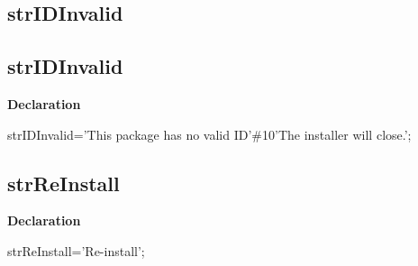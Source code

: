 \documentclass{report}
\newif\ifpdf
\begin{document}
\subsection*{\large{\textbf{strIDInvalid}}\normalsize\hspace{1ex}\hrulefill}
\else
\subsection*{strIDInvalid}
\fi
\label{trstrings-strIDInvalid}
\begin{list}{}{
\setlength{\itemindent}{0cm}
\setlength{\listparindent}{0cm}
\setlength{\leftmargin}{\evensidemargin}
\addtolength{\leftmargin}{\tmplength}
\settowidth{\labelsep}{X}
\addtolength{\leftmargin}{\labelsep}
\setlength{\labelwidth}{\tmplength}
}
\item[\textbf{Declaration}\hfill]
\ifpdf
\begin{flushleft}
\fi
\begin{ttfamily}
strIDInvalid='This package has no valid ID'{\#}10'The installer will close.';\end{ttfamily}

\ifpdf
\end{flushleft}
\fi

\end{list}
\ifpdf
\subsection*{\large{\textbf{strReInstall}}\normalsize\hspace{1ex}\hrulefill}
\else
\subsection*{strReInstall}
\fi
\label{trstrings-strReInstall}
\begin{list}{}{
\setlength{\itemindent}{0cm}
\setlength{\listparindent}{0cm}
\setlength{\leftmargin}{\evensidemargin}
\addtolength{\leftmargin}{\tmplength}
\settowidth{\labelsep}{X}
\addtolength{\leftmargin}{\labelsep}
\setlength{\labelwidth}{\tmplength}
}
\item[\textbf{Declaration}\hfill]
\ifpdf
\begin{flushleft}
\fi
\begin{ttfamily}
strReInstall='Re-install';\end{ttfamily}

\ifpdf
\end{flushleft}
\fi

\end{list}
\ifpdf
\end{document}
